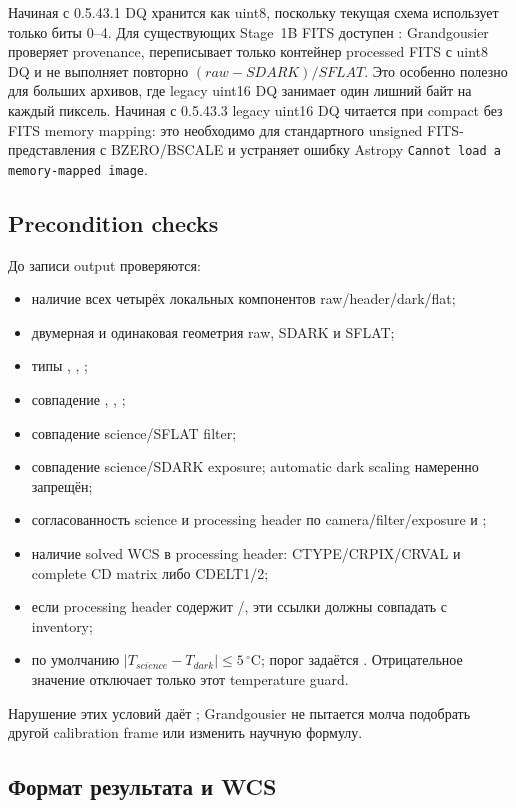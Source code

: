 Начиная с 0.5.43.1 DQ хранится как uint8, поскольку текущая схема использует только биты 0--4. Для существующих Stage~1B FITS доступен : Grandgousier проверяет provenance, переписывает только контейнер processed FITS с uint8 DQ и не выполняет повторно $(raw-SDARK)/SFLAT$. Это особенно полезно для больших архивов, где legacy uint16 DQ занимает один лишний байт на каждый пиксель. Начиная с 0.5.43.3 legacy uint16 DQ читается при compact без FITS memory mapping: это необходимо для стандартного unsigned FITS-представления с BZERO/BSCALE и устраняет ошибку Astropy \texttt{Cannot load a memory-mapped image}.

\subsection{Precondition checks}

До записи output проверяются:

\begin{itemize}
  \item наличие всех четырёх локальных компонентов raw/header/dark/flat;
  \item двумерная и одинаковая геометрия raw, SDARK и SFLAT;
  \item типы , , ;
  \item совпадение , , ;
  \item совпадение science/SFLAT filter;
  \item совпадение science/SDARK exposure; automatic dark scaling намеренно запрещён;
  \item согласованность science и processing header по camera/filter/exposure и ;
  \item наличие solved WCS в processing header: CTYPE/CRPIX/CRVAL и complete CD matrix либо CDELT1/2;
  \item если processing header содержит /, эти ссылки должны совпадать с inventory;
  \item по умолчанию $|T_{science}-T_{dark}|\le 5\,^{\circ}\mathrm{C}$; порог задаётся . Отрицательное значение отключает только этот temperature guard.
\end{itemize}

Нарушение этих условий даёт ; Grandgousier не пытается молча подобрать другой calibration frame или изменить научную формулу.

\subsection{Формат результата и WCS}

